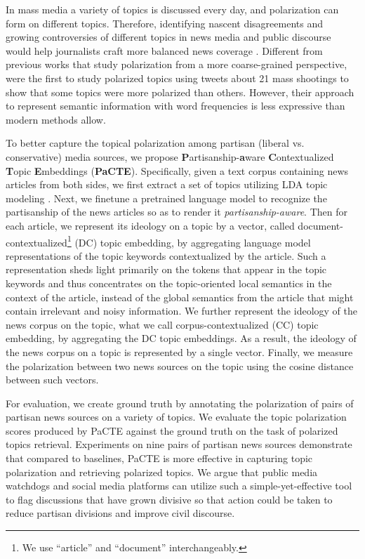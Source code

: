 \documentclass[11pt]{article}
\begin{document}
In mass media a variety of topics is discussed every day, and polarization can form on different topics. Therefore, identifying nascent disagreements and growing controversies of different topics in news media and public discourse would help journalists craft more balanced news coverage \cite{lorenz2020behavioural, chen2020analyzing}.
Different from previous works that study polarization from a more coarse-grained perspective, \citet{demszky2019analyzing} were the first to study polarized topics using tweets about 21 mass shootings to show that some topics were more polarized than others. However, their approach to represent semantic information with word frequencies is less expressive than modern methods allow.

To better capture the topical polarization among partisan (liberal vs. conservative) media sources,
we propose \textbf{P}artisanship-\textbf{a}ware \textbf{C}ontextualized \textbf{T}opic \textbf{E}mbeddings (\textbf{PaCTE}). Specifically, given a text corpus containing news articles from both sides, we first extract a set of topics utilizing LDA topic modeling \cite{blei2003latent}. Next, we finetune a pretrained language model \cite{devlin2018bert} to recognize the partisanship of the news articles so as to render it \emph{partisanship-aware}. Then for each article, we represent its ideology on a topic by a vector, called document-contextualized\footnote{We use ``article'' and ``document'' interchangeably.} (DC) topic embedding, by aggregating language model representations of the topic keywords contextualized by the article. Such a representation sheds light primarily on the tokens that appear in the topic keywords and thus concentrates on the topic-oriented local semantics in the context of the article, instead of the global semantics from the article that might contain irrelevant and noisy information. We further represent the ideology of the news corpus on the topic, what we call corpus-contextualized (CC) topic embedding, by aggregating the DC topic embeddings. As a result, the ideology of the news corpus on a topic is represented by a single vector. Finally, we measure the polarization between two news sources on the topic using the cosine distance between such vectors. 

For evaluation, we create ground truth by annotating the polarization of pairs of partisan news sources on a variety of topics. We evaluate the topic polarization scores produced by PaCTE against the ground truth on the task of polarized topics retrieval. Experiments on nine pairs of partisan news sources demonstrate that compared to baselines, PaCTE is more effective in capturing topic polarization and retrieving polarized topics. We argue that public media watchdogs and social media platforms can utilize such a simple-yet-effective tool to flag discussions that have grown divisive so that action could be taken to reduce partisan divisions and improve civil discourse. 
\end{document}

